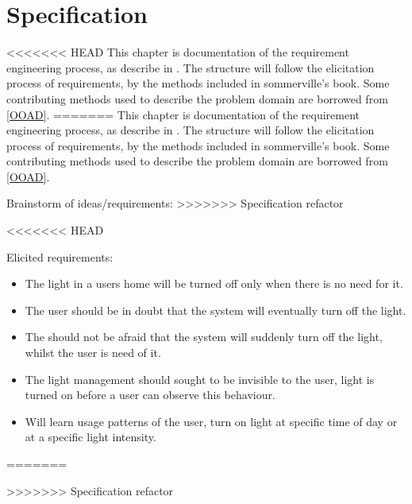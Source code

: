 \chapter{Specification}

<<<<<<< HEAD
This chapter is documentation of the requirement engineering process, as describe in \cite{sommerville}. The structure will follow the elicitation process of requirements, by the methods included in sommerville's book. Some contributing methods used to describe the problem domain are borrowed from \cref{OOAD}. 
=======
This chapter is documentation of the requirement engineering process, as describe in \citep{sommerville}. The structure will follow the elicitation process of requirements, by the methods included in sommerville's book. Some contributing methods used to describe the problem domain are borrowed from \cref{OOAD}. 

Brainstorm of ideas/requirements:
>>>>>>> Specification refactor







<<<<<<< HEAD





Elicited requirements: %

\begin{itemize}
\item The light in a users home will be turned off only when there is no need for it.
\item The user should be in doubt that the system will eventually turn off the light.
\item The should not be afraid that the system will suddenly turn off the light, whilst the user is need of it.
\item The light management should sought to be invisible to the user, light is turned on before a user can observe this behaviour.
\item Will learn usage patterns of the user, turn on light at specific time of day or at a specific light intensity.
\end{itemize}
=======




>>>>>>> Specification refactor
